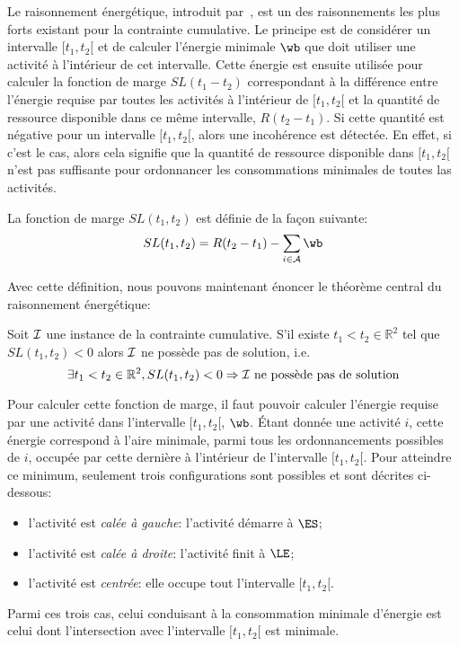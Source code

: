 Le raisonnement énergétique, introduit par~\cite{RELopez}, est un des
raisonnements les plus forts existant pour la contrainte
cumulative. Le principe est de considérer un intervalle $[t_1,t_2[$ et
de calculer l'énergie minimale $\wb$ que doit utiliser une activité à
l'intérieur de cet intervalle. Cette énergie est ensuite utilisée pour
calculer la fonction de marge $SL(t_1-t_2)$ correspondant à la
différence entre l'énergie requise par toutes les activités à
l'intérieur de $[t_1,t_2[$ et la quantité de ressource disponible dans
ce même intervalle, $R (t_2-t_1)$. Si cette quantité est négative pour
un intervalle $[t_1,t_2[$, alors une incohérence est détectée. En
effet, si c'est le cas, alors cela signifie que la quantité de
ressource disponible dans $[t_1,t_2[$ n'est pas suffisante pour
ordonnancer les consommations minimales de toutes las activités.

\begin{defi}
La fonction de marge $SL(t_1,t_2)$ est définie de la façon suivante: 
\[  SL(t_1,t_2) = R (t_2-t_1) - \sum_{i \in \A} \wb \]
\end{defi}

Avec cette définition, nous pouvons maintenant énoncer le théorème
central du raisonnement énergétique:
 
\begin{theo}
\label{th:centerRE}
Soit ${\cal I}$ une instance de la contrainte cumulative. S'il existe
$t_1 < t_2 \in \mathbb{R}^2$ tel que $SL(t_1,t_2) <0$ alors ${\cal I}$ ne
possède pas de solution, i.e.
\begin{equation}
\exists t_1 < t_2 \in \mathbb{R}^2 , SL(t_1,t_2) <0 \Rightarrow {\cal I}
\text{ ne possède pas de solution}
\label{eq:centerRE}
\end{equation}
\end{theo}

Pour calculer cette fonction de marge, il faut pouvoir calculer
l'énergie requise par une activité dans l'intervalle $[t_1,t_2[$,
$\wb$. {\'E}tant donnée une activité $i$, cette énergie correspond à
l'aire minimale, parmi tous les ordonnancements possibles de $i$,
occupée par cette dernière à l'intérieur de l'intervalle
$[t_1,t_2[$. Pour atteindre ce minimum, seulement trois configurations
sont possibles et sont décrites ci-dessous:
\begin{itemize}
\item l'activité est {\it calée à gauche}: l'activité démarre à $\ES$; 
\item l'activité est {\it  calée à droite}: l'activité finit à $\LE$;
\item l'activité est {\it centrée}: elle occupe tout l'intervalle
  $[t_1,t_2[$.
\end{itemize}
Parmi ces trois cas, celui conduisant à la consommation minimale
d'énergie est celui dont l'intersection avec l'intervalle $[t_1,t_2[$
est minimale. 


